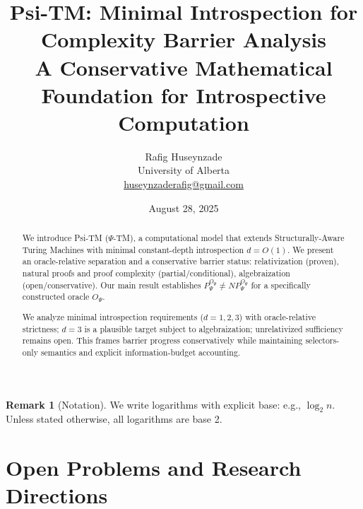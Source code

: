 \documentclass[11pt]{article}
\title{Psi-TM: Minimal Introspection for Complexity Barrier Analysis\\
\large{A Conservative Mathematical Foundation for Introspective Computation}}
\author{Rafig Huseynzade\\
University of Alberta\\
\href{mailto:huseynzaderafig@gmail.com}{huseynzaderafig@gmail.com}}
\date{August 28, 2025}
\theoremstyle{plain}
\theoremstyle{definition}
\newtheorem{remark}[theorem]{Remark}
\begin{document}
\maketitle

\begin{abstract}
We introduce Psi-TM ($\Psi$-TM), a computational model that extends Structurally-Aware Turing Machines with minimal constant-depth introspection $d = O(1)$. We present an oracle-relative separation and a conservative barrier status: relativization (proven), natural proofs and proof complexity (partial/conditional), algebraization (open/conservative). Our main result establishes $P^{O_{\Psi}}_{\Psi} \neq NP^{O_{\Psi}}_{\Psi}$ for a specifically constructed oracle $O_{\Psi}$.

We analyze minimal introspection requirements ($d=1,2,3$) with oracle-relative strictness; $d=3$ is a plausible target subject to algebraization; unrelativized sufficiency remains open. This frames barrier progress conservatively while maintaining selectors-only semantics and explicit information-budget accounting.
\end{abstract}

\tableofcontents
\newpage

\begin{remark}[Notation]
We write logarithms with explicit base: e.g., $\log_{2} n$. Unless stated otherwise, all logarithms are base 2.
\end{remark}

















\section{Open Problems and Research Directions}
\end{document}
